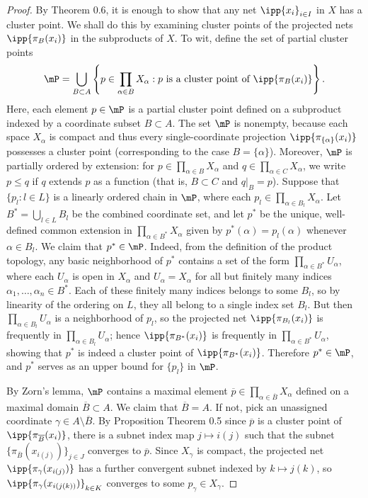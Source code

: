 \documentclass[12pt,english]{article}
\begin{document}
\begin{proof}
By Theorem 0.6, it is enough to show that any net $\ipp{ x_i }_{i \in I}$ in $X$ has a cluster point. 
We shall do this by examining cluster points of the projected nets $\ipp{ \pi_B(x_i) }$ in the subproducts of $X$. To wit, define the set of partial cluster points
\[
\mP = \bigcup_{B \subset A} \left\{ p \in \prod_{\alpha \in B} X_\alpha : p \text{ is a cluster point of } \ipp{ \pi_B(x_i) } \right\}.
\]
Here, each element $p \in \mP$ is a partial cluster point defined on a subproduct indexed by a coordinate subset $B \subset A$. 
The set $\mP$ is nonempty, because each space $X_\alpha$ is compact and thus every single-coordinate projection $\ipp{ \pi_{\{\alpha\}}(x_i) }$ possesses a cluster point (corresponding to the case $B = \{\alpha\}$).
Moreover, $\mP$ is partially ordered by extension: for $p \in \prod_{\alpha \in B} X_\alpha$ and $q \in \prod_{\alpha \in C} X_\alpha$, we write $p \le q$ if $q$ extends $p$ as a function (that is, $B \subset C$ and $q|_{B} = p$).
Suppose that $\{p_l : l \in L\}$ is a linearly ordered chain in $\mP$, where each $p_l \in \prod_{\alpha \in B_l} X_\alpha$. 
Let $B^* = \bigcup_{l \in L} B_l$ be the combined coordinate set, and let $p^*$ be the unique, well-defined common extension in $\prod_{\alpha \in B^*} X_\alpha$ given by $p^*(\alpha) = p_l(\alpha)$ whenever $\alpha \in B_l$. 
We claim that $p^* \in \mP$. Indeed, from the definition of the product topology, any basic neighborhood of $p^*$ contains a set of the form $\prod_{\alpha \in B^*} U_\alpha$, where each $U_\alpha$ is open in $X_\alpha$ and $U_\alpha = X_\alpha$ for all but finitely many indices $\alpha_1, \dots, \alpha_n \in B^*$. Each of these finitely many indices belongs to some $B_l$, so by linearity of the ordering on $L$, they all belong to a single index set $B_l$. 
But then $\prod_{\alpha \in B_l} U_\alpha$ is a neighborhood of $p_l$, so the projected net $\ipp{ \pi_{B_l}(x_i) }$ is frequently in $\prod_{\alpha \in B_l} U_\alpha$; hence $\ipp{ \pi_{B^*}(x_i) }$ is frequently in $\prod_{\alpha \in B^*} U_\alpha$, showing that $p^*$ is indeed a cluster point of $\ipp{ \pi_{B^*}(x_i) }$. 
Therefore $p^* \in \mP$, and $p^*$ serves as an upper bound for $\{p_l\}$ in $\mP$.

By Zorn's lemma, $\mP$ contains a maximal element $\overline{p} \in \prod_{\alpha \in \overline{B}} X_\alpha$ defined on a maximal domain $\overline{B} \subset A$. We claim that $\overline{B} = A$. If not, pick an unassigned coordinate $\gamma \in A \setminus \overline{B}$. By Proposition Theorem 0.5 since $\overline{p}$ is a cluster point of $\ipp{ \pi_{\overline{B}}(x_i) }$, there is a subnet index map $j \mapsto i(j)$ such that the subnet $\{\pi_{\overline{B}}(x_{i(j)})\}_{j \in J}$ converges to $\overline{p}$. Since $X_\gamma$ is compact, the projected net $\ipp{ \pi_\gamma(x_{i(j)}) }$ has a further convergent subnet indexed by $k \mapsto j(k)$, so $\ipp{ \pi_\gamma(x_{i(j(k))}) }_{k \in K}$ converges to some $p_\gamma \in X_\gamma$.


\end{proof}
\end{document}
